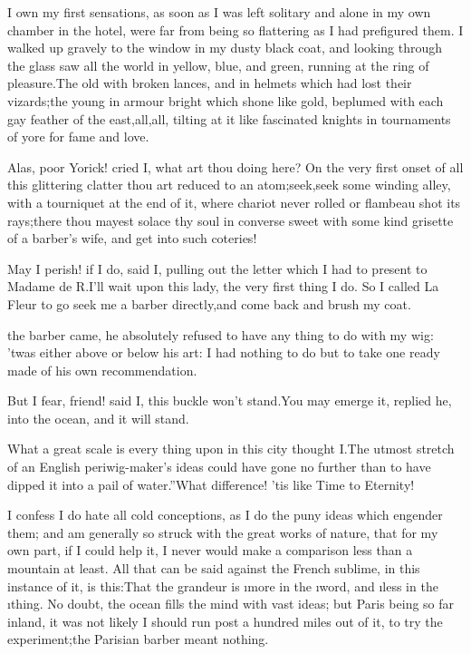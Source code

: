 \documentclass[twoside]{article}
\begin{document}
I own my first sensations, as soon as I was left solitary and alone in my
own chamber in the hotel, were far from being so flattering as I had
prefigured them.  I walked up gravely to the window in my dusty black
coat, and looking through the glass saw all the world in yellow, blue,
and green, running at the ring of pleasure.\tsk The old with broken lances,
and in helmets which had lost their vizards;\tsk the young in armour bright
which shone like gold, beplumed with each gay feather of the
east,\tsk all,\tsk all, tilting at it like fascinated knights in tournaments of
yore for fame and love.\tsk 

Alas, poor Yorick! cried I, what art thou doing here?  On the very first
onset of all this glittering clatter thou art reduced to an
atom;\tsk seek,\tsk seek some winding alley, with a tourniquet at the end of it,
where chariot never rolled or flambeau shot its rays;\tsk there thou mayest
solace thy soul in converse sweet with some kind grisette of a barber’s
wife, and get into such coteries!\tsk 

\tsk May I perish! if I do, said I, pulling out the letter which I had to
present to Madame de R\tsk .\tsk I’ll wait upon this lady, the very first thing I
do.  So I called La Fleur to go seek me a barber directly,\tsk and come back
and brush my coat.






 the barber came, he absolutely refused to have any thing to do with
my wig: ’twas either above or below his art: I had nothing to do but to
take one ready made of his own recommendation.

\tsk But I fear, friend! said I, this buckle won’t stand.\tsk You may emerge it,
replied he, into the ocean, and it will stand.\tsk 

What a great scale is every thing upon in this city thought I.\tsk The utmost
stretch of an English periwig-maker’s ideas could have gone no further
than to have \lqq dipped it into a pail of water.”\tsk What difference! ’tis like
Time to Eternity!

I confess I do hate all cold conceptions, as I do the puny ideas which
engender them; and am generally so struck with the great works of nature,
that for my own part, if I could help it, I never would make a comparison
less than a mountain at least.  All that can be said against the French
sublime, in this instance of it, is this:\tsk That the grandeur is \i{more} in
the \i{word}, and \i{less} in the \i{thing}.  No doubt, the ocean fills the
mind with vast ideas; but Paris being so far inland, it was not likely I
should run post a hundred miles out of it, to try the experiment;\tsk the
Parisian barber meant nothing.\tsk 
\end{document}
